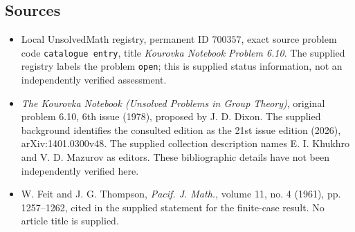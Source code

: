 \documentclass[11pt]{article}
\begin{document}
\subsection{Sources}
\begin{itemize}
\item Local UnsolvedMath registry, permanent ID \(700357\), exact source problem code \texttt{catalogue entry}, title \emph{Kourovka Notebook Problem 6.10}. The supplied registry labels the problem \texttt{open}; this is supplied status information, not an independently verified assessment.
\item \emph{The Kourovka Notebook (Unsolved Problems in Group Theory)}, original problem 6.10, 6th issue (1978), proposed by J. D. Dixon. The supplied background identifies the consulted edition as the 21st issue edition (2026), arXiv:1401.0300v48. The supplied collection description names E. I. Khukhro and V. D. Mazurov as editors. These bibliographic details have not been independently verified here.
\item W. Feit and J. G. Thompson, \emph{Pacif. J. Math.}, volume 11, no. 4 (1961), pp. 1257--1262, cited in the supplied statement for the finite-case result. No article title is supplied.
\end{itemize}
\end{document}
